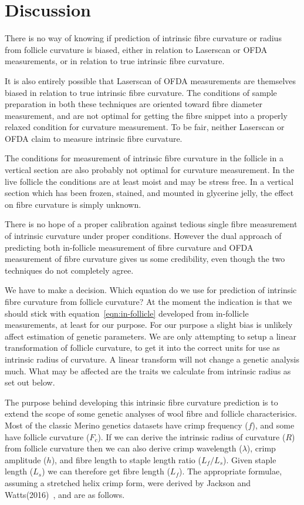 \documentclass[titlepage]{article}  %
\begin{document}
\section{Discussion}
There is no way of knowing if prediction of intrinsic fibre curvature or radius from follicle curvature is biased, either in relation to Laserscan or OFDA measurements, or in relation to true intrinsic fibre curvature.

It is also entirely possible that  Laserscan of OFDA measurements are  themselves biased in relation to true intrinsic fibre curvature. The conditions of sample preparation in both these techniques are oriented toward fibre diameter measurement, and are not optimal for getting the fibre snippet into a properly relaxed condition for curvature measurement. To be fair, neither Laserscan or OFDA claim to measure intrinsic fibre curvature.

The conditions for measurement of intrinsic fibre curvature in the follicle in a vertical section are also probably not optimal for curvature measurement. In the live follicle the conditions are at least moist and may be stress free. In a vertical section which has been frozen, stained, and mounted in glycerine jelly, the effect on fibre curvature is simply unknown. 

There is no hope of a proper calibration against tedious single fibre measurement of intrinsic curvature under proper conditions. However the dual approach of predicting both in-follicle measurement of fibre curvature and OFDA measurement of fibre curvature gives us some credibility, even though the two techniques do not completely agree.

We have to make a decision. Which equation do we use for prediction of intrinsic fibre curvature from follicle curvature? At  the moment the indication is that we should stick with equation~\ref{eqn:in-follicle} developed from in-follicle measurements, at least for our purpose. For our purpose a slight bias is unlikely affect estimation of genetic parameters. We are only attempting to setup a linear transformation of follicle curvature, to get it into the correct units for use as intrinsic radius of curvature. A linear transform will not change a genetic analysis much. What may be affected are the traits we calculate from intrinsic radius as set out below.
 
The purpose behind developing this intrinsic fibre curvature prediction is to extend the scope of some genetic analyses of wool fibre and follicle characterisics. Most of the classic Merino genetics datasets have crimp frequency ($f$), and some have follicle curvature ($F_{c}$). If we can derive the intrinsic radius of curvature ($R$) from follicle curvature then we can also derive crimp wavelength ($\lambda$), crimp amplitude ($h$), and fibre length to staple length ratio ($L_{f}/L_{s}$). Given staple length ($L_{s}$) we can therefore get fibre length ($L_{f}$). The appropriate formulae, assuming a stretched helix crimp form, were derived by Jackson and Watts(2016)~\cite{jack:16}, and are as follows. 
\end{document}
